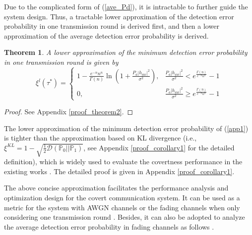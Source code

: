 \documentclass[conference]{IEEEtran}
\newtheorem{theorem}{Theorem}
\begin{document}
Due to the complicated form of (\ref{ave_Pd}), it is intractable to further guide the system design. Thus, a tractable lower approximation of the detection error probability in one transmission round is derived first, and then a lower approximation of the average detection error probability is derived.

\begin{theorem}
A lower approximation of the minimum detection error probability in one transmission round is given by
	\begin{equation}\label{app1}
		{\xi ^{l}(\tau^*)}\!\!=\!\! \begin{cases} \!1 \!-\! \frac{{{e^{ - n}}{n^n}}}{{\Gamma \left( n \right)}}\ln \!\left(\! {1 \!+\! \frac{{{P_a}{{\left| {{h_{aw}}} \right|}^2}}}{{{\sigma ^2}}}} \!\right)\!\!,\! & \!\frac{{{P_a}{{\left| {{h_{aw}}} \right|}^2}}}{{{\sigma ^2}}} \!<\!  {{e^{\frac{{\Gamma \left( n \right)}}{{{e^{ - n}}{n^n}}}}} \!-\! 1}  \\0,\! & \!\frac{{{P_a}{{\left| {{h_{aw}}} \right|}^2}}}{{{\sigma ^2}}} \!\ge\!  {{e^{\frac{{\Gamma \left( n \right)}}{{{e^{ - n}}{n^n}}}}} \!-\! 1} \end{cases}
	\end{equation}
\end{theorem}

\begin{proof}
	See Appendix \ref{proof_theorem2}.
\end{proof}


The lower approximation of the minimum detection error probability of (\ref{app1}) is tighter than the approximation based on KL divergence (i.e., ${\xi ^{KL}} = 1 - \sqrt {\frac{1}{2}\mathcal{D}\left( {{\mathbb{P}_0}||{\mathbb{P}_1}} \right)}$, see Appendix \ref{proof_corollary1} for the detailed definition), which is widely used to evaluate the covertness performance in the existing works \cite{ECT2,DF}. The detailed proof is given in Appendix \ref{proof_corollary1}.

The above concise approximation facilitates the performance analysis and optimization design for the covert communication system. It can be used as a metric for the system with AWGN channels \cite{Gaussian} or the fading channels when only considering one transmission round \cite{ECT2}. Besides, it can also be adopted to analyze the average detection error probability in fading channels as follows \cite{ECT2,Nmin}.
\end{document}
